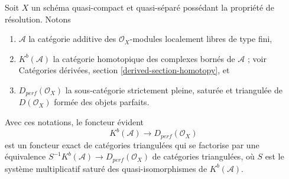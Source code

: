 \begin{proposition}
\label{proposition-perfect-resolution-property}
Soit $X$ un schéma quasi-compact et quasi-séparé possédant la
propriété de résolution. Notons
\begin{enumerate}
\item $\mathcal{A}$ la catégorie additive des
$\mathcal{O}_X$-modules localement libres de type fini,
\item $K^b(\mathcal{A})$ la catégorie homotopique des complexes bornés
de $\mathcal{A}$ ; voir
Catégories dérivées, section \ref{derived-section-homotopy}, et
\item $D_{perf}(\mathcal{O}_X)$ la sous-catégorie strictement pleine, saturée
et triangulée de $D(\mathcal{O}_X)$ formée des
objets parfaits.
\end{enumerate}
Avec ces notations, le foncteur évident
$$
K^b(\mathcal{A}) \longrightarrow D_{perf}(\mathcal{O}_X)
$$
est un foncteur exact de catégories triangulées qui se factorise par une
équivalence $S^{-1}K^b(\mathcal{A}) \to D_{perf}(\mathcal{O}_X)$
de catégories triangulées,
où $S$ est le système multiplicatif saturé des quasi-isomorphismes
de $K^b(\mathcal{A})$.
\end{proposition}

